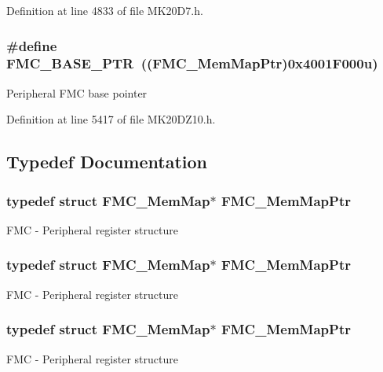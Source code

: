 Definition at line 4833 of file M\+K20\+D7.\+h.

\subsubsection[{\texorpdfstring{F\+M\+C\+\_\+\+B\+A\+S\+E\+\_\+\+P\+TR}{FMC_BASE_PTR}}]{\setlength{\rightskip}{0pt plus 5cm}\#define F\+M\+C\+\_\+\+B\+A\+S\+E\+\_\+\+P\+TR~(({\bf F\+M\+C\+\_\+\+Mem\+Map\+Ptr})0x4001\+F000u)}\hypertarget{group___f_m_c___peripheral_ga0a740437b573e32e6b932bf729485fd9}{}\label{group___f_m_c___peripheral_ga0a740437b573e32e6b932bf729485fd9}
Peripheral F\+MC base pointer 

Definition at line 5417 of file M\+K20\+D\+Z10.\+h.



\subsection{Typedef Documentation}
\subsubsection[{\texorpdfstring{F\+M\+C\+\_\+\+Mem\+Map\+Ptr}{FMC_MemMapPtr}}]{\setlength{\rightskip}{0pt plus 5cm}typedef struct {\bf F\+M\+C\+\_\+\+Mem\+Map}$\ast$ {\bf F\+M\+C\+\_\+\+Mem\+Map\+Ptr}}\hypertarget{group___f_m_c___peripheral_ga0552c12b8b29667270d15450ed977a6e}{}\label{group___f_m_c___peripheral_ga0552c12b8b29667270d15450ed977a6e}
F\+MC -\/ Peripheral register structure 
\subsubsection[{\texorpdfstring{F\+M\+C\+\_\+\+Mem\+Map\+Ptr}{FMC_MemMapPtr}}]{\setlength{\rightskip}{0pt plus 5cm}typedef struct {\bf F\+M\+C\+\_\+\+Mem\+Map}$\ast$ {\bf F\+M\+C\+\_\+\+Mem\+Map\+Ptr}}\hypertarget{group___f_m_c___peripheral_ga0552c12b8b29667270d15450ed977a6e}{}\label{group___f_m_c___peripheral_ga0552c12b8b29667270d15450ed977a6e}
F\+MC -\/ Peripheral register structure 
\subsubsection[{\texorpdfstring{F\+M\+C\+\_\+\+Mem\+Map\+Ptr}{FMC_MemMapPtr}}]{\setlength{\rightskip}{0pt plus 5cm}typedef struct {\bf F\+M\+C\+\_\+\+Mem\+Map}$\ast$ {\bf F\+M\+C\+\_\+\+Mem\+Map\+Ptr}}\hypertarget{group___f_m_c___peripheral_ga0552c12b8b29667270d15450ed977a6e}{}\label{group___f_m_c___peripheral_ga0552c12b8b29667270d15450ed977a6e}
F\+MC -\/ Peripheral register structure 